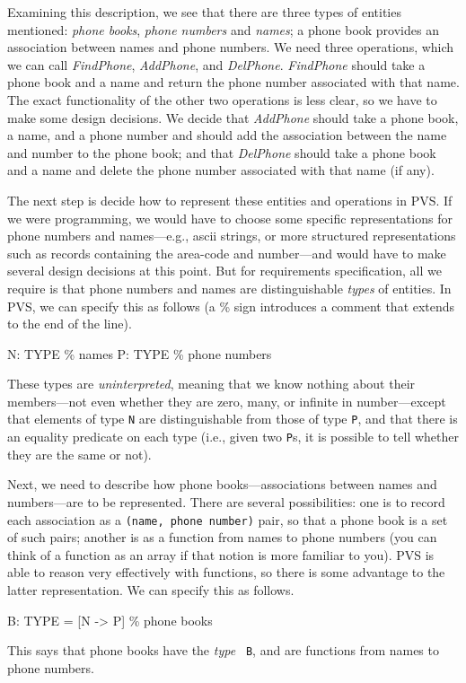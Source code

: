 Examining this description, we see that there are three types of
entities mentioned: {\em phone books}, {\em phone numbers} and {\em
names\/}; a phone book provides an association between names and
phone numbers.  We need three operations, which we can call {\em
FindPhone\/}, {\em AddPhone}, and {\em DelPhone\/}.  {\em FindPhone\/}
should take a phone book and a name and return the phone number
associated with that name.  The exact functionality of the other two
operations is less clear, so we have to make some design decisions.
We decide that {\em AddPhone} should take a phone book, a name, and a
phone number and should add the association between the name and
number to the phone book; and that {\em DelPhone\/} should take a
phone book and a name and delete the phone number associated with that
name (if any).

The next step is decide how to represent these entities and operations
in PVS\@.  If we were programming, we would have to choose some specific
representations for phone numbers and names---e.g., ascii strings, or
more structured representations such as records containing the
area-code and number---and would have to make several design decisions
at this point.  But for requirements specification, all we require is
that phone numbers and names are distinguishable {\em types\/} of
entities.  In PVS, we can specify this as follows (a \% sign
introduces a comment that extends to the end of the line).
\begin{jmrsession}
  N: TYPE              \% names
  P: TYPE              \% phone numbers
\end{jmrsession}
These types are {\em uninterpreted\/}, meaning that we know nothing
about their members---not even whether they are zero, many, or
infinite in number---except that elements of type {\tt N} are
distinguishable from those of type {\tt P}, and that there is an
equality predicate on each type (i.e., given two {\tt P}s, it is
possible to tell whether they are the same or not).

Next, we need to describe how phone books---associations between names
and numbers---are to be represented.  There are several possibilities:
one is to record each association as a {\tt (name, phone number)}
pair, so that a phone book is a set of such pairs; another is as a
function from names to phone numbers (you can think of a function as
an array if that notion is more familiar to you).  PVS is able to
reason very effectively with functions, so there is some advantage to
the latter representation.  We can specify this as follows.
\begin{jmrsession}
  B: TYPE = [N -> P]   \% phone books
\end{jmrsession}
This says that phone books have the {\em type\/} {\tt
B}, and are functions from names to phone numbers.

